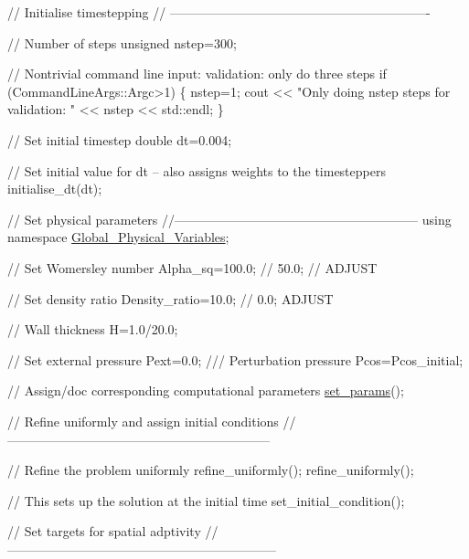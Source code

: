 \begin{DoxyCodeInclude}
{ \textcolor{comment}{// Initialise timestepping}
 \textcolor{comment}{// -------------------------------------------------------------}

 \textcolor{comment}{// Number of steps}
 \textcolor{keywordtype}{unsigned} nstep=300;

 \textcolor{comment}{// Nontrivial command line input: validation: only do three steps}
 \textcolor{keywordflow}{if} (CommandLineArgs::Argc>1)
  \{
   nstep=1;
   cout << \textcolor{stringliteral}{"Only doing nstep steps for validation: "} << nstep << std::endl;
  \}

 \textcolor{comment}{// Set initial timestep}
 \textcolor{keywordtype}{double} dt=0.004; 

 \textcolor{comment}{// Set initial value for dt  -- also assigns weights to the timesteppers}
 initialise\_dt(dt);

 \textcolor{comment}{// Set physical parameters}
 \textcolor{comment}{//---------------------------------------------------------}
 \textcolor{keyword}{using namespace }\hyperlink{namespaceGlobal__Physical__Variables}{Global\_Physical\_Variables};

 \textcolor{comment}{// Set Womersley number}
 Alpha\_sq=100.0; \textcolor{comment}{// 50.0; // ADJUST}

 \textcolor{comment}{// Set density ratio}
 Density\_ratio=10.0; \textcolor{comment}{// 0.0; ADJUST}

 \textcolor{comment}{// Wall thickness}
 H=1.0/20.0;

 \textcolor{comment}{// Set external pressure}
 Pext=0.0;
 \textcolor{comment}{}
\textcolor{comment}{ /// Perturbation pressure}
\textcolor{comment}{} Pcos=Pcos\_initial;

 \textcolor{comment}{// Assign/doc corresponding computational parameters}
 \hyperlink{namespaceGlobal__Physical__Variables_a5928252d8e7440b329065c223926d4d2}{set\_params}();


 \textcolor{comment}{// Refine uniformly and assign initial conditions}
 \textcolor{comment}{//--------------------------------------------------------------}

 \textcolor{comment}{// Refine the problem uniformly }
 refine\_uniformly();
 refine\_uniformly();

 \textcolor{comment}{// This sets up the solution at the initial time}
 set\_initial\_condition();

 \textcolor{comment}{// Set targets for spatial adptivity}
 \textcolor{comment}{//---------------------------------------------------------------}

}
\end{DoxyCodeInclude}

